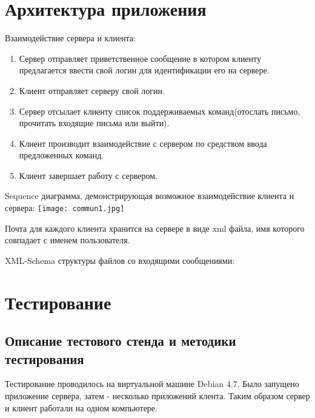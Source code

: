 \documentclass[12pt,a4paper]{report}
\begin{document}
\section{Архитектура приложения}
Взаимодействие сервера и клиента:
\begin{enumerate}
\item Сервер отправляет приветственное сообщение в котором клиенту предлагается ввести свой логин для идентификации его на сервере.
\item Клиент отправляет серверу свой логин.
\item Сервер отсылает клиенту список поддерживаемых команд(отослать письмо, прочитать входящие письма или выйти).
\item Клиент производит взаимодействие с сервером по средством ввода предложенных команд.
\item Клиент завершает работу с сервером.
\end{enumerate}
\pagebreak
\flushleft
Sequence диаграмма, демонстрирующая возможное взаимодействие клиента и сервера:
\linebreak
\center \texttt{[image: commun1.jpg]}
\flushleft

Почта для каждого клиента хранится на сервере в виде xml файла, имя которого совпадает с именем пользователя.

XML-Schema структуры файлов со входящими сообщениями:



\section{Тестирование}
\subsection{Описание тестового стенда и методики тестирования}
Тестирование проводилось на виртуальной машине Debian 4.7. Было запущено приложение сервера, затем - несколько приложений клента. Таким образом сервер и клиент работали на одном компьютере.
\end{document}
